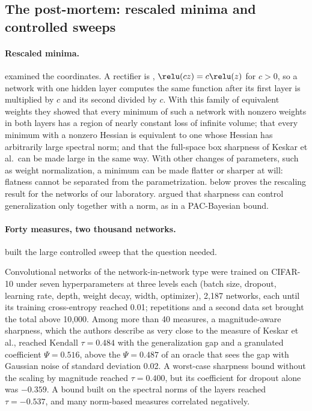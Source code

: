 \begin{refsection}
\section{The post-mortem: rescaled minima and controlled sweeps}\label{sec:sharpness:postmortem}

\paragraph{Rescaled minima.} \Textcite{DinhEtAl2017} examined the coordinates. A rectifier is , $\relu(cz)=c\relu(z)$ for $c>0$, so a network with one hidden layer computes the same function after its first layer is multiplied by $c$ and its second divided by $c$. With this family of equivalent weights they showed that every minimum of such a network with nonzero weights in both layers has a region of nearly constant loss of infinite volume; that every minimum with a nonzero Hessian is equivalent to one whose Hessian has arbitrarily large spectral norm; and that the full-space box sharpness of Keskar et al.\ can be made large in the same way. With other changes of parameters, such as weight normalization, a minimum can be made flatter or sharper at will: flatness cannot be separated from the parametrization.  below proves the rescaling result for the networks of our laboratory. \Textcite{NeyshaburEtAl2017} argued that sharpness can control generalization only together with a norm, as in a PAC-Bayesian bound.

\paragraph{Forty measures, two thousand networks.} \Textcite{JiangEtAl2020} built the large controlled sweep that the question needed.

\begin{finding}\label{fd:sharpness:jiang}
Convolutional networks of the network-in-network type were trained on CIFAR-10 under seven hyperparameters at three levels each (batch size, dropout, learning rate, depth, weight decay, width, optimizer), 2,187 networks, each until its training cross-entropy reached 0.01; repetitions and a second data set brought the total above 10,000. Among more than 40 measures, a magnitude-aware sharpness, which the authors describe as very close to the measure of Keskar et al., reached Kendall $\tau=0.484$ with the generalization gap and a granulated coefficient $\Psi=0.516$, above the $\Psi=0.487$ of an oracle that sees the gap with Gaussian noise of standard deviation 0.02. A worst-case sharpness bound without the scaling by magnitude reached $\tau=0.400$, but its coefficient for dropout alone was $-0.359$. A bound built on the spectral norms of the layers reached $\tau=-0.537$, and many norm-based measures correlated negatively.
\end{finding}


\end{refsection}
